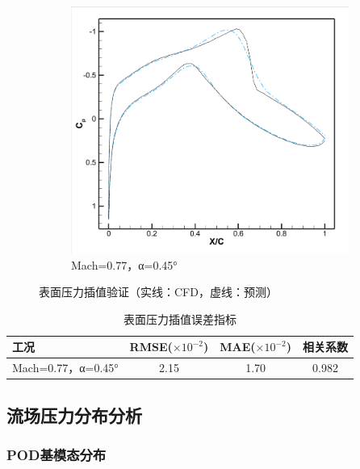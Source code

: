 \begin{figure}[H]
    \centering
    \begin{subfigure}[b]{0.45\textwidth}
        \includegraphics[width=\textwidth]{image/表面压力对比图/0.770.45对比图.png}
        \caption{Mach=0.77，α=0.45°}
    \end{subfigure}
    \caption{\songti 表面压力插值验证（实线：CFD，虚线：预测）}
    \label{fig:double_surface_validation}
\end{figure}

\begin{table}[H]
    \centering
    \caption{表面压力插值误差指标}
    \label{tab:double_surface_error}
    \begin{tabular}{lccc}
        \toprule
        工况 & RMSE($\times10^{-2}$) & MAE($\times10^{-2}$) & 相关系数 \\
        \midrule
        Mach=0.77，α=0.45° & 2.15 & 1.70 & 0.982 \\
        \bottomrule
    \end{tabular}
\end{table}

\subsection{流场压力分布分析}

\subsubsection{POD基模态分布}

